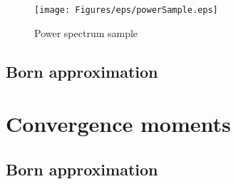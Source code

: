 \begin{figure}
\begin{center}
\texttt{[image: Figures/eps/powerSample.eps]}
\end{center}
\caption{Power spectrum sample}
\label{fig:4:psample}
\end{figure}

\subsection{Born approximation}


\section{Convergence moments}

\subsection{Born approximation}

